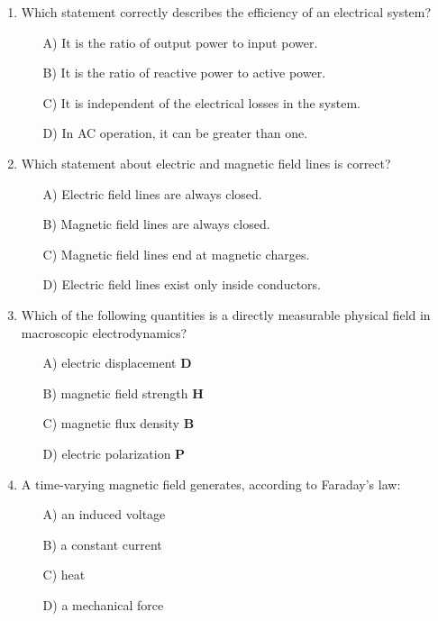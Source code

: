 \documentclass[a4paper,12pt]{article}
\newif\ifshowsolutions
\begin{document}
\begin{enumerate}[label=\textbf{\arabic*.}, leftmargin=*, itemsep=8pt]
\ifshowsolutions
Solution: B
\fi

  \item Which statement correctly describes the efficiency of an electrical system?
    \begin{itemize}[label=$\square$]
      \item[A)] It is the ratio of output power to input power.
      \item[B)] It is the ratio of reactive power to active power.
      \item[C)] It is independent of the electrical losses in the system.
      \item[D)] In AC operation, it can be greater than one.
    \end{itemize}

\ifshowsolutions
Solution: A
\fi

  \item Which statement about electric and magnetic field lines is correct?
    \begin{itemize}[label=$\square$]
      \item[A)] Electric field lines are always closed.
      \item[B)] Magnetic field lines are always closed.
      \item[C)] Magnetic field lines end at magnetic charges.
      \item[D)] Electric field lines exist only inside conductors.
    \end{itemize}

\ifshowsolutions
Solution: B
\fi

  \item Which of the following quantities is a directly measurable physical field in macroscopic electrodynamics?
    \begin{itemize}[label=$\square$]
      \item[A)] electric displacement \(\mathbf{D}\)
      \item[B)] magnetic field strength \(\mathbf{H}\)
      \item[C)] magnetic flux density \(\mathbf{B}\)
      \item[D)] electric polarization \(\mathbf{P}\)
    \end{itemize}

\ifshowsolutions
Solution: C
\fi

  \item A time-varying magnetic field generates, according to Faraday’s law:
    \begin{itemize}[label=$\square$]
      \item[A)] an induced voltage
      \item[B)] a constant current
      \item[C)] heat
      \item[D)] a mechanical force
    \end{itemize}


\end{enumerate}
\end{document}
